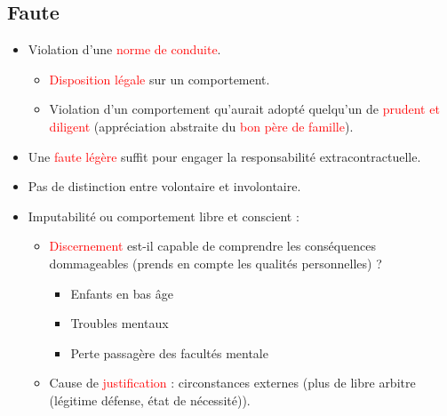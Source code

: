 \subsection{Faute}
\begin{itemize}
	\item Violation d'une \textcolor{red}{norme de conduite}.
	\begin{itemize}
		\item \textcolor{red}{Disposition légale} sur un comportement.
		\item Violation d'un comportement qu'aurait adopté quelqu'un de \textcolor{red}{prudent et diligent} (appréciation abstraite du \textcolor{red}{bon père de famille}).
	\end{itemize}
	\item Une \textcolor{red}{faute légère} suffit pour engager la responsabilité extracontractuelle.
	\item Pas de distinction entre volontaire et involontaire.
	\item Imputabilité ou comportement libre et conscient :
	\begin{itemize}
		\item \textcolor{red}{Discernement} est-il capable de comprendre les conséquences dommageables (prends en compte les qualités personnelles) ?
		\begin{itemize}
			\item Enfants en bas âge
			\item Troubles mentaux
			\item Perte passagère des facultés mentale
		\end{itemize}
		\item Cause de \textcolor{red}{justification} : circonstances externes (plus de libre arbitre (légitime défense, état de nécessité)).
	\end{itemize}
\end{itemize}

